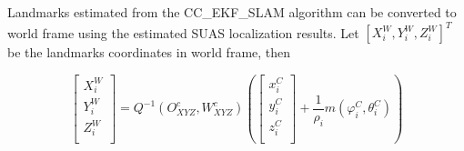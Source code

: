 Landmarks estimated from the CC\_EKF\_SLAM algorithm can be converted to world frame using the estimated SUAS localization results. Let $[X_i^W,Y_i^W, Z_i^W]^T$ be the landmarks coordinates in world frame, then

\begin{equation}
  \left[ \begin{array}{c}
    X_{i}^{W}  \\
    Y_{i}^{W}  \\
    Z_{i}^{W}  \\
  \end{array} \right]=Q^{-1}(O_{XYZ}^{c}, W_{XYZ}^{c})\left(\left[
    \begin{array}{c}
      x_{i}^{C} \\
      y_{i}^{C} \\
      z_{i}^{C} \\
    \end{array}
  \right]+\frac{1}{\rho _{i}}m(\varphi _{i}^{C},\theta_{i}^{C})\right)
\end{equation}


